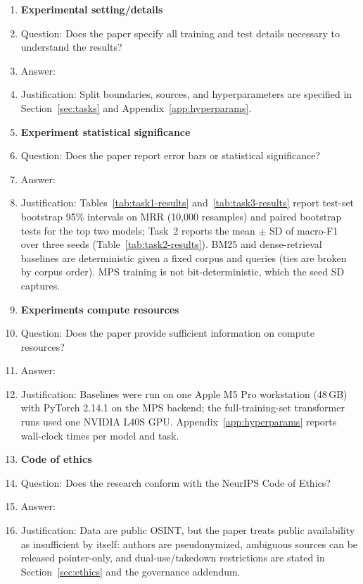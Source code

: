 \documentclass{article}
\begin{document}
\begin{enumerate}
\item {\bf Experimental setting/details}
    \item[] Question: Does the paper specify all training and test details necessary to understand the results?
    \item[] Answer: \answerYes{}
    \item[] Justification: Split boundaries, sources, and hyperparameters are specified in Section~\ref{sec:tasks} and Appendix~\ref{app:hyperparams}.

\item {\bf Experiment statistical significance}
    \item[] Question: Does the paper report error bars or statistical significance?
    \item[] Answer: \answerYes{}
    \item[] Justification: Tables~\ref{tab:task1-results} and~\ref{tab:task3-results} report test-set bootstrap 95\% intervals on MRR (10,000 resamples) and paired bootstrap tests for the top two models; Task~2 reports the mean $\pm$ SD of macro-F1 over three seeds (Table~\ref{tab:task2-results}). BM25 and dense-retrieval baselines are deterministic given a fixed corpus and queries (ties are broken by corpus order). MPS training is not bit-deterministic, which the seed SD captures.

\item {\bf Experiments compute resources}
    \item[] Question: Does the paper provide sufficient information on compute resources?
    \item[] Answer: \answerYes{}
    \item[] Justification: Baselines were run on one Apple M5 Pro workstation (48\,GB) with PyTorch 2.14.1 on the MPS backend; the full-training-set transformer runs used one NVIDIA L40S GPU. Appendix~\ref{app:hyperparams} reports wall-clock times per model and task.

\item {\bf Code of ethics}
    \item[] Question: Does the research conform with the NeurIPS Code of Ethics?
    \item[] Answer: \answerYes{}
    \item[] Justification: Data are public OSINT, but the paper treats public availability as insufficient by itself: authors are pseudonymized, ambiguous sources can be released pointer-only, and dual-use/takedown restrictions are stated in Section~\ref{sec:ethics} and the governance addendum.


\end{enumerate}
\end{document}
